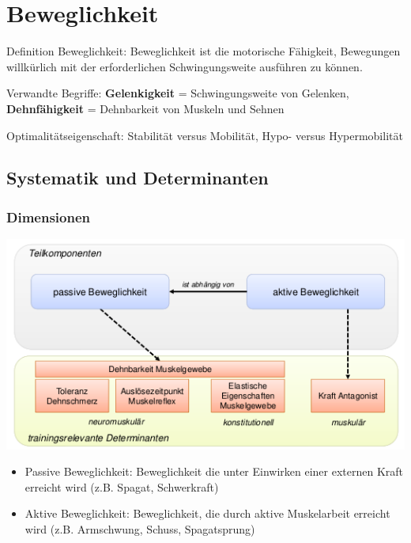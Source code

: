 
\section{Beweglichkeit}

Definition Beweglichkeit: Beweglichkeit ist die motorische Fähigkeit, Bewegungen willkürlich mit der erforderlichen Schwingungsweite ausführen zu können.

Verwandte Begriffe: \textbf{Gelenkigkeit} = Schwingungsweite von Gelenken, \textbf{Dehnfähigkeit} = Dehnbarkeit von Muskeln und Sehnen

Optimalitätseigenschaft: Stabilität versus Mobilität, Hypo- versus Hypermobilität

\subsection{Systematik und Determinanten}

\subsubsection*{Dimensionen }

\begin{minipage}{0.7\textwidth}
\includegraphics[width=\textwidth]{pictures/beweg_determinanten4}
\end{minipage}
\begin{minipage}{0.3\textwidth}
\begin{itemize}
    \item Passive Beweglichkeit: Beweglichkeit die unter Einwirken einer externen Kraft erreicht wird (z.B. Spagat, Schwerkraft)
    \item Aktive Beweglichkeit: Beweglichkeit, die durch aktive Muskelarbeit erreicht wird (z.B. Armschwung, Schuss, Spagatsprung)
\end{itemize}
\end{minipage}

